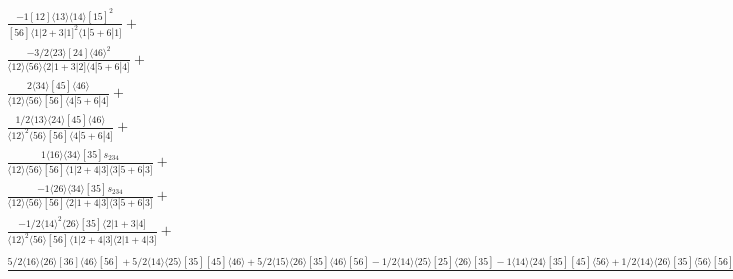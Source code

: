 \documentclass[varwidth, border=5pt]{standalone}
\begin{document}
\begin{my}
$\begin{gathered}
\scriptscriptstyle\frac{-1[12]⟨13⟩⟨14⟩[15]^2}{[56]⟨1|2+3|1]^2⟨1|5+6|1]}+\\
\scriptscriptstyle\frac{-3/2⟨23⟩[24]⟨46⟩^2}{⟨12⟩⟨56⟩⟨2|1+3|2]⟨4|5+6|4]}+\\
\scriptscriptstyle\frac{2⟨34⟩[45]⟨46⟩}{⟨12⟩⟨56⟩[56]⟨4|5+6|4]}+\\
\scriptscriptstyle\frac{1/2⟨13⟩⟨24⟩[45]⟨46⟩}{⟨12⟩^2⟨56⟩[56]⟨4|5+6|4]}+\\
\scriptscriptstyle\frac{1⟨16⟩⟨34⟩[35]s_{234}}{⟨12⟩⟨56⟩[56]⟨1|2+4|3]⟨3|5+6|3]}+\\
\scriptscriptstyle\frac{-1⟨26⟩⟨34⟩[35]s_{234}}{⟨12⟩⟨56⟩[56]⟨2|1+4|3]⟨3|5+6|3]}+\\
\scriptscriptstyle\frac{-1/2⟨14⟩^2⟨26⟩[35]⟨2|1+3|4]}{⟨12⟩^2⟨56⟩[56]⟨1|2+4|3]⟨2|1+4|3]}+\\
\scriptscriptstyle\frac{5/2⟨16⟩⟨26⟩[36]⟨46⟩[56]+5/2⟨14⟩⟨25⟩[35][45]⟨46⟩+5/2⟨15⟩⟨26⟩[35]⟨46⟩[56]-1/2⟨14⟩⟨25⟩[25]⟨26⟩[35]-1⟨14⟩⟨24⟩[35][45]⟨56⟩+1/2⟨14⟩⟨26⟩[35]⟨56⟩[56]+2⟨14⟩⟨26⟩[35]⟨36⟩[36]+2⟨14⟩⟨26⟩⟨35⟩[35]^2-1⟨14⟩⟨26⟩[34]⟨46⟩[56]+5/2⟨14⟩⟨26⟩[35]⟨46⟩[46]-2⟨12⟩⟨24⟩[25][35]⟨56⟩-3⟨12⟩⟨34⟩[35]^2⟨56⟩+1⟨14⟩[23]⟨26⟩^2[56]-1/2⟨14⟩⟨26⟩^2[26][35]-2⟨12⟩[35]⟨46⟩⟨56⟩[56]+5/2⟨12⟩⟨26⟩[26][35]⟨46⟩+5/2⟨12⟩⟨25⟩[25][35]⟨46⟩}{⟨12⟩⟨56⟩[56]⟨1|2+4|3]⟨2|1+4|3]}\phantom{+}
\end{gathered}$
\end{my}
\end{document}
